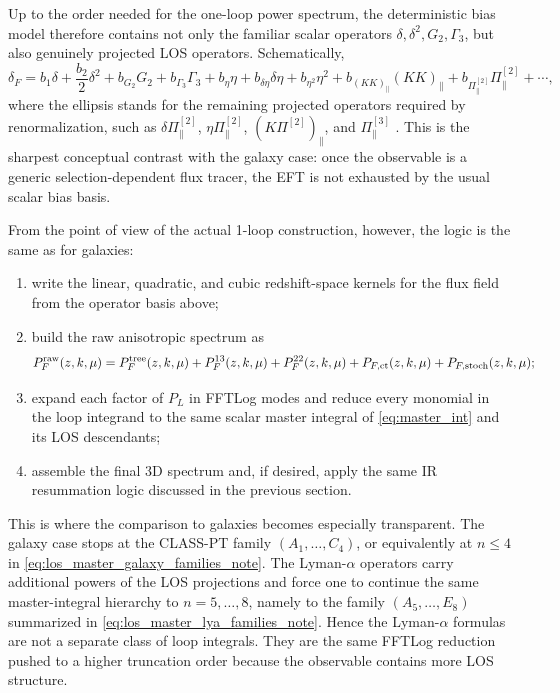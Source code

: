 \documentclass[a4paper,11pt]{article}
\newcommand{\<}{\langle}
\renewcommand{\>}{\rangle}
\begin{document}
Up to the order needed for the one-loop power spectrum, the deterministic bias model
therefore contains not only the familiar scalar operators
\(\delta,\delta^2,G_2,\Gamma_3\), but also genuinely projected LOS operators.
Schematically,
\begin{equation}
\delta_F
=
b_1\delta
+\frac{b_2}{2}\delta^2
+b_{G_2}G_2
+b_{\Gamma_3}\Gamma_3
+b_\eta \eta
+b_{\delta\eta}\delta\eta
+b_{\eta^2}\eta^2
+b_{(KK)_\parallel}(KK)_\parallel
+b_{\Pi_\parallel^{[2]}}\Pi_\parallel^{[2]}
+\cdots ,
\label{eq:lya_bias_schematic_note}
\end{equation}
where the ellipsis stands for the remaining projected operators required by
renormalization, such as \(\delta\Pi_\parallel^{[2]}\),
\(\eta\Pi_\parallel^{[2]}\), \((K\Pi^{[2]})_\parallel\), and
\(\Pi_\parallel^{[3]}\) \cite{Ivanov:2023yla}. This is the sharpest conceptual
contrast with the galaxy case: once the observable is a generic selection-dependent
flux tracer, the EFT is not exhausted by the usual scalar bias basis.

From the point of view of the actual 1-loop construction, however, the logic is the
same as for galaxies:
\begin{enumerate}
\item write the linear, quadratic, and cubic redshift-space kernels for the flux
field from the operator basis above;
\item build the raw anisotropic spectrum as
\begin{equation}
P_F^{\rm raw}(z,k,\mu)
=
P_F^{\rm tree}(z,k,\mu)
+P_F^{13}(z,k,\mu)
+P_F^{22}(z,k,\mu)
+P_{F,\rm ct}(z,k,\mu)
+P_{F,\rm stoch}(z,k,\mu);
\label{eq:lya_raw_note}
\end{equation}
\item expand each factor of \(P_L\) in FFTLog modes and reduce every monomial in the
loop integrand to the same scalar master integral of \cref{eq:master_int} and its
LOS descendants;
\item assemble the final 3D spectrum and, if desired, apply the same IR resummation
logic discussed in the previous section.
\end{enumerate}

This is where the comparison to galaxies becomes especially transparent. The galaxy
case stops at the CLASS-PT family \((A_1,\ldots,C_4)\), or equivalently at
\(n\leq 4\) in \cref{eq:los_master_galaxy_families_note}. The Lyman-\(\alpha\)
operators carry additional powers of the LOS projections and force one to continue
the same master-integral hierarchy to \(n=5,\ldots,8\), namely to the family
\((A_5,\ldots,E_8)\) summarized in \cref{eq:los_master_lya_families_note}. Hence
the Lyman-\(\alpha\) formulas are not a separate class of loop integrals. They are
the same FFTLog reduction pushed to a higher truncation order because the observable
contains more LOS structure.
\end{document}
